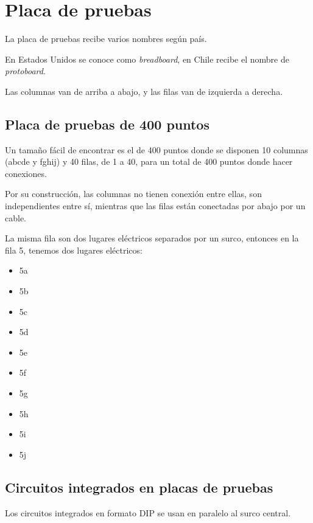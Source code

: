 \documentclass[../principal.tex]{subfiles}
\begin{document}
\chapter{Placa de pruebas}

La placa de pruebas recibe varios nombres según país.

En Estados Unidos se conoce como \textit{breadboard}, en Chile recibe el nombre de  \textit{protoboard}.

Las columnas van de arriba a abajo, y las filas van de izquierda a derecha.

\section{Placa de pruebas de 400 puntos}

Un tamaño fácil de encontrar es el de 400 puntos donde se disponen 10 columnas (abcde y fghij) y 40 filas, de 1 a 40, para un total de 400 puntos donde hacer conexiones.

Por su construcción, las columnas no tienen conexión entre ellas, son independientes entre sí, mientras que las filas están conectadas por abajo por un cable.

La misma fila son dos lugares eléctricos separados por un surco, entonces en la fila 5, tenemos dos lugares eléctricos:

\begin{itemize}
    \item 5a
    \item 5b
    \item 5c
    \item 5d
    \item 5e
\end{itemize}

\begin{itemize}
    \item 5f
    \item 5g
    \item 5h
    \item 5i
    \item 5j
\end{itemize}

\section{Circuitos integrados en placas de pruebas}

Los circuitos integrados en formato DIP se usan en paralelo al surco central.

\newpage
\end{document}
